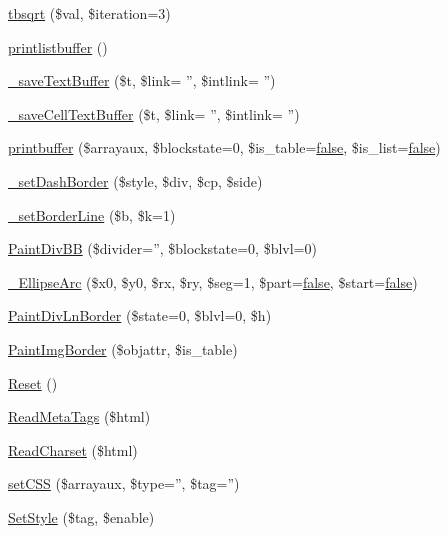 \begin{DoxyCompactItemize}
\hyperlink{classm_p_d_f_a0bda3b1c1a56f14d485fd94a38264869}{tbsqrt} (\$val, \$iteration=3)
\item 
\hyperlink{classm_p_d_f_a6b68620ec5d9f5b8acad511035e07f3f}{printlistbuffer} ()
\item 
\hyperlink{classm_p_d_f_a8e87007db0219be62546568500990032}{\-\_\-save\-Text\-Buffer} (\$t, \$link= '', \$intlink= '')
\item 
\hyperlink{classm_p_d_f_af8e9136db170783a156b64022ea9a022}{\-\_\-save\-Cell\-Text\-Buffer} (\$t, \$link= '', \$intlink= '')
\item 
\hyperlink{classm_p_d_f_aa4f9a2f862e0a63b6e1798ad1008d9cc}{printbuffer} (\$arrayaux, \$blockstate=0, \$is\-\_\-table=\hyperlink{ttfontsuni_8php_afbaa04e5cc97693dc668b3c45d3dd740}{false}, \$is\-\_\-list=\hyperlink{ttfontsuni_8php_afbaa04e5cc97693dc668b3c45d3dd740}{false})
\item 
\hyperlink{classm_p_d_f_a25d82b5cc47a60543ba3137cd1c66802}{\-\_\-set\-Dash\-Border} (\$style, \$div, \$cp, \$side)
\item 
\hyperlink{classm_p_d_f_a7305ea52fd10227160ad0cdb558e9cdf}{\-\_\-set\-Border\-Line} (\$b, \$k=1)
\item 
\hyperlink{classm_p_d_f_a502608d06dca386d124985def18ded53}{Paint\-Div\-B\-B} (\$divider='', \$blockstate=0, \$blvl=0)
\item 
\hyperlink{classm_p_d_f_a3d327df4af69bee9a5c2f875bde7f95c}{\-\_\-\-Ellipse\-Arc} (\$x0, \$y0, \$rx, \$ry, \$seg=1, \$part=\hyperlink{ttfontsuni_8php_afbaa04e5cc97693dc668b3c45d3dd740}{false}, \$start=\hyperlink{ttfontsuni_8php_afbaa04e5cc97693dc668b3c45d3dd740}{false})
\item 
\hyperlink{classm_p_d_f_abe3baea3ff030b299b3fe2ee0a70e60e}{Paint\-Div\-Ln\-Border} (\$state=0, \$blvl=0, \$h)
\item 
\hyperlink{classm_p_d_f_a0f2474447fd3bd37002c2e0d24fdc714}{Paint\-Img\-Border} (\$objattr, \$is\-\_\-table)
\item 
\hyperlink{classm_p_d_f_af3989da27ce0ff50e2b64286a38530f7}{Reset} ()
\item 
\hyperlink{classm_p_d_f_a00b240c52de6b491e2a5724ad6067099}{Read\-Meta\-Tags} (\$html)
\item 
\hyperlink{classm_p_d_f_ad7604c3df4b811c28daf3a1ad8d2f9c8}{Read\-Charset} (\$html)
\item 
\hyperlink{classm_p_d_f_a91f4252b225b5d5e42b02032388db212}{set\-C\-S\-S} (\$arrayaux, \$type='', \$tag='')
\item 
\hyperlink{classm_p_d_f_a135b7f00c4a589d887f274a71389686d}{Set\-Style} (\$tag, \$enable)

\end{DoxyCompactItemize}
